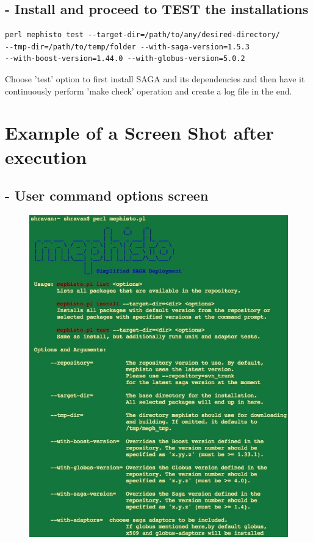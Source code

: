 \documentclass[a4paper,10pt]{article}
\begin{document}
\subsection*{- Install and proceed to TEST the installations}
\begin{verbatim}
perl mephisto test --target-dir=/path/to/any/desired-directory/ 
--tmp-dir=/path/to/temp/folder --with-saga-version=1.5.3 
--with-boost-version=1.44.0 --with-globus-version=5.0.2
\end{verbatim}
Choose 'test' option to first install SAGA and its dependencies and then have it
continuously perform 'make check' operation and create a log file in the end.
\section*{Example of a Screen Shot after execution}
\subsection*{- User command options screen}
\begin{figure}[H]
\begin{center}
\includegraphics[scale=0.60]{userscreen1.jpg}
\end{center}
\end{figure}
\end{document}
